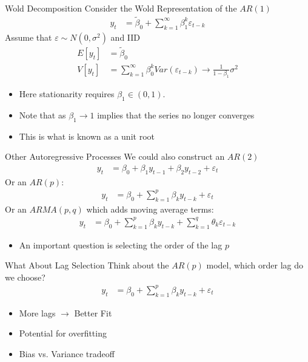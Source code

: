 \begin{frame}{Wold Decomposition}
Consider the Wold Representation of the $AR(1)$
\begin{align*}
y_t &= \widetilde{\beta}_0 + \sum_{k=1}^{\infty} \beta_1^{k} \varepsilon_{t-k}
\end{align*}
Assume that $\varepsilon \sim N(0,\sigma^2)$ and IID
\begin{align*}
E[y_t] &= \widetilde{\beta}_0 \\
V[y_t] &= \sum_{k=1}^{\infty} \beta_0^{k} Var(\varepsilon_{t-k})  \rightarrow \frac{1}{1-\beta_1} \sigma^2 
\end{align*}
\begin{itemize}
    \item Here \alert{stationarity} requires $\beta_1 \in (0,1)$.
    \item Note that as $\beta_1 \rightarrow 1$ implies that the series no longer converges
    \item This is what is known as a \alert{unit root}
\end{itemize}
\end{frame}

\begin{frame}{Other Autoregressive Processes}
We could also construct an $AR(2)$
\begin{align*}
y_t &= \beta_0 + \beta_1 y_{t-1} + \beta_2 y_{t-2} + \varepsilon_{t}
\end{align*}
Or an $AR(p)$:
\begin{align*}
y_t &= \beta_0 + \sum_{k=1}^p \beta_k y_{t-k} + \varepsilon_{t}
\end{align*}
Or an $ARMA(p,q)$ which adds moving average terms:
\begin{align*}
y_t &= \beta_0 + \sum_{k=1}^p \beta_k y_{t-k} + \sum_{k=1}^q \theta_k \varepsilon_{t-k} 
\end{align*}
\begin{itemize}
\item An important question is \alert{selecting the order of the lag} $p$
\end{itemize}
\end{frame}


\begin{frame}{What About Lag Selection}
Think about the $AR(p)$ model, which order lag do we choose?
\begin{align*}
y_t &= \beta_0 + \sum_{k=1}^p \beta_k y_{t-k} + \varepsilon_{t}
\end{align*}
\begin{itemize}
  \item More lags $\rightarrow$ Better Fit
  \item Potential for \alert{overfitting}
  \item Bias vs. Variance tradeoff
\end{itemize}
\end{frame}

